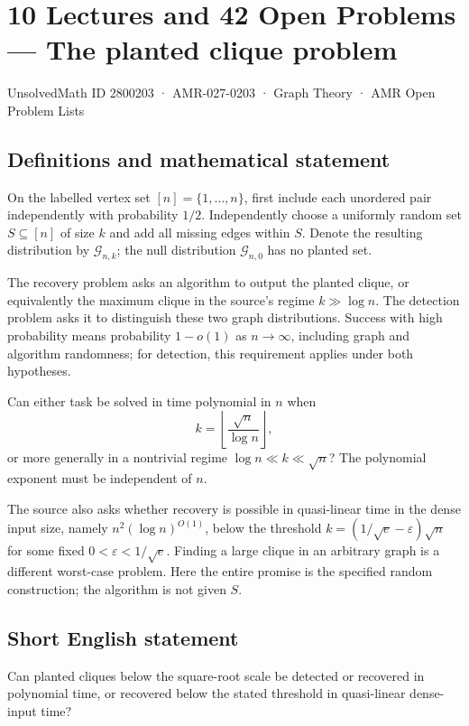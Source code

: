 \documentclass[11pt,a4paper]{article}
\begin{document}
\section*{10 Lectures and 42 Open Problems — The planted clique problem}\label{2800203}
{\small UnsolvedMath ID 2800203 · AMR-027-0203 · Graph Theory · AMR Open Problem Lists}
\subsection{Definitions and mathematical statement}
On the labelled vertex set $[n]=\{1,\ldots,n\}$, first include each
unordered pair independently with probability $1/2$. Independently choose
a uniformly random set $S\subseteq[n]$ of size $k$ and add all missing
edges within $S$. Denote the resulting distribution by $\mathcal G_{n,k}$;
the null distribution $\mathcal G_{n,0}$ has no planted set.

The recovery problem asks an algorithm to output the planted clique,
or equivalently the maximum clique in the source's regime
$k\gg\log n$. The detection problem asks it to distinguish these two
graph distributions. Success with high probability means probability
$1-o(1)$ as $n\to\infty$, including graph and algorithm randomness;
for detection, this requirement applies under both hypotheses.

Can either task be solved in time polynomial in $n$ when
\[
                 k=\left\lfloor\frac{\sqrt n}{\log n}\right\rfloor,
\]
or more generally in a nontrivial regime $\log n\ll k\ll\sqrt n$?
The polynomial exponent must be independent of $n$.

The source also asks whether recovery is possible in quasi-linear time
in the dense input size, namely $n^2(\log n)^{O(1)}$, below the threshold
$k=(1/\sqrt e-\varepsilon)\sqrt n$ for some fixed
$0<\varepsilon<1/\sqrt e$. Finding a large clique in an arbitrary graph
is a different worst-case problem. Here the entire promise is the
specified random construction; the algorithm is not given $S$.
\subsection{Short English statement}
Can planted cliques below the square-root scale be detected or recovered in polynomial time, or recovered below the stated threshold in quasi-linear dense-input time?
\end{document}
